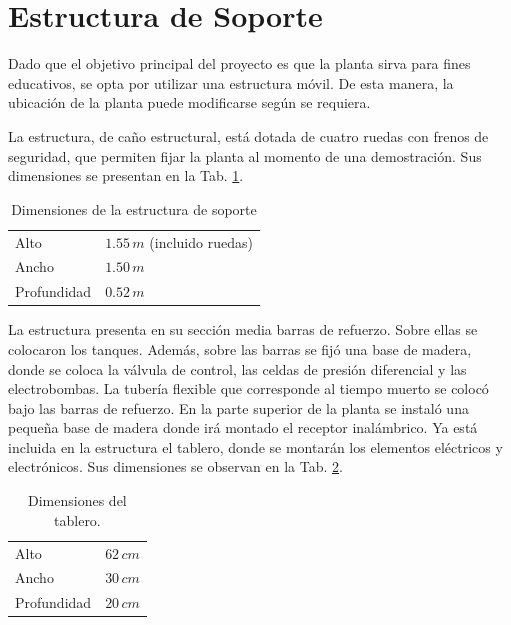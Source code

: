 \section{Estructura de Soporte}
\label{sec:EstructuraSoporte}

Dado que el objetivo principal del proyecto es que la planta sirva para fines
educativos, se opta por utilizar una estructura móvil.
De esta manera, la ubicación de la planta puede modificarse según se requiera.

La estructura, de caño estructural, está dotada de cuatro ruedas con frenos de
seguridad, que permiten fijar la
planta al momento de una demostración.
Sus dimensiones se presentan en la Tab. \ref{tab:dimensionesEstructura}.

\begin{table}[ht]
\renewcommand{\arraystretch}{1.3}
\centering
\begin{tabular}{|l|l|}
\hline
Alto & $1.55\,m$ (incluido ruedas)\\
Ancho &  $1.50\,m$\\
Profundidad &  $0.52\,m$\\
\hline
\end{tabular}
\caption{Dimensiones de la estructura de soporte}
\label{tab:dimensionesEstructura}
\end{table}
 
La estructura presenta en su sección media barras de refuerzo.
Sobre ellas se colocaron los tanques.
Además, sobre las barras se fijó una base de madera, donde se coloca la
válvula de control, las celdas de presión diferencial
y las electrobombas.
La tubería flexible que corresponde al tiempo muerto se colocó bajo
las barras de refuerzo.
En la parte superior de la planta se instaló una pequeña base de
madera donde irá montado el receptor inalámbrico.
Ya está incluida en la estructura el tablero, donde se
montarán los elementos eléctricos y electrónicos.
Sus dimensiones se observan en la Tab. \ref{tab:dimensionesTablero}.

\begin{table}[h]
\renewcommand{\arraystretch}{1.3}
\centering
\begin{tabular}{|l|l|}
\hline
Alto & $62\,cm$\\
Ancho &  $30\,cm$\\
Profundidad &  $20\,cm$\\
\hline
\end{tabular}
\caption{Dimensiones del tablero.}
\label{tab:dimensionesTablero}
\end{table}

